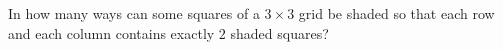 In how many ways can some squares of a $3\times3$ grid be shaded so that each row and each column contains exactly $2$ shaded squares?
